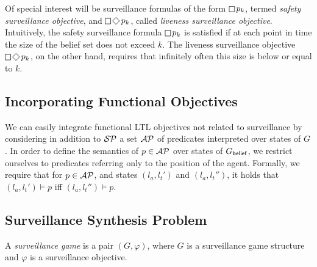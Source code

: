 Of special interest will be surveillance formulas of the form $\LTLglobally p_k$, termed \emph{safety surveillance objective}, and $\LTLglobally\LTLfinally p_k$, called \emph{liveness surveillance objective}.
Intuitively, the safety surveillance formula $\LTLglobally p_k$ is satisfied if at each point in time the size of the belief set does not exceed $k$. The liveness surveillance objective $\LTLglobally\LTLfinally p_k$, on the other hand, requires that infinitely often this size is below or equal to $k$.


\begin{example}
\end{example}


\subsection{Incorporating Functional Objectives}
We can easily integrate functional LTL objectives not related to surveillance by considering in addition to $\mathcal{SP}$ a set $\mathcal{AP}$ of predicates interpreted over states of $G$. In order to define the semantics of $p \in \mathcal{AP}$ over states of $G_{\mathsf{belief}}$, we restrict ourselves to predicates referring only to the position of the agent. Formally, we require that for $p \in \mathcal{AP}$, and states $(l_a,l_t')$ and $(l_a,l_t'')$, it holds that  $(l_a,l_t') \models p$ iff $(l_a,l_t'') \models p$. 

\begin{example}
\end{example}

\subsection{Surveillance Synthesis Problem}
A \emph{surveillance game} is a pair $(G,\varphi)$, where $G$ is a surveillance game structure and $\varphi$ is a surveillance objective.


